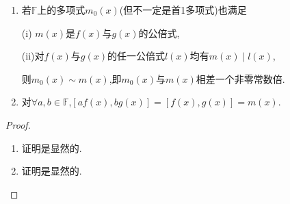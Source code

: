 \documentclass[../../main.tex]{subfiles}%
\begin{document}
\begin{proposition}\label{proposition:最小公倍式的小结论}
\begin{enumerate}[(1)]
\item 若$\mathbb{F}$上的多项式$m_0(x)$(但不一定是首1多项式)也满足

(i)\(\,\,m(x)\)是\(f(x)\)与\(g(x)\)的公倍式,

(ii)对\(f(x)\)与\(g(x)\)的任一公倍式\(l(x)\)均有\(m(x)\mid l(x)\),

则$m_0(x)\sim m(x)$,即$m_0(x)$与$m(x)$相差一个非零常数倍.

\item 对$\forall a,b\in\mathbb{F}$,$[af(x),bg(x)]=[f(x),g(x)]=m(x)$.
\end{enumerate}
\end{proposition}
\begin{proof}
\begin{enumerate}[(1)]
\item 证明是显然的.

\item 证明是显然的.
\end{enumerate}

\end{proof}
\end{document}
